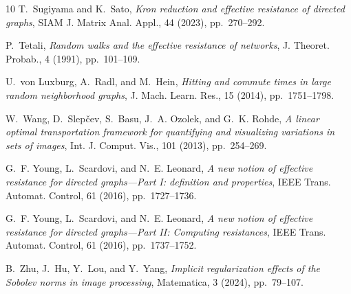 \documentclass[11pt,a4paper]{article}
\begin{document}
\begin{thebibliography}{10}
    {\sc T.~Sugiyama and K.~Sato}, {\em Kron reduction and effective resistance of directed graphs}, SIAM J. Matrix Anal. Appl., 44 (2023), pp.~270--292.

    {\sc P.~Tetali}, {\em Random walks and the effective resistance of networks}, J. Theoret. Probab., 4 (1991), pp.~101--109.

    {\sc U.~von Luxburg, A.~Radl, and M.~Hein}, {\em Hitting and commute times in large random neighborhood graphs}, J. Mach. Learn. Res., 15 (2014), pp.~1751--1798.

    {\sc W.~Wang, D.~Slep{\v c}ev, S.~Basu, J.~A. Ozolek, and G.~K. Rohde}, {\em A linear optimal transportation framework for quantifying and visualizing variations in sets of images}, Int. J. Comput. Vis., 101 (2013), pp.~254--269.

    {\sc G.~F. Young, L.~Scardovi, and N.~E. Leonard}, {\em A new notion of effective resistance for directed graphs---{P}art {I}: definition and properties}, IEEE Trans. Automat. Control, 61 (2016), pp.~1727--1736.

    {\sc G.~F. Young, L.~Scardovi, and N.~E. Leonard}, {\em A new notion of effective resistance for directed graphs---{P}art {II}: {C}omputing resistances}, IEEE Trans. Automat. Control, 61 (2016), pp.~1737--1752.

    {\sc B.~Zhu, J.~Hu, Y.~Lou, and Y.~Yang}, {\em Implicit regularization effects of the {S}obolev norms in image processing}, Matematica, 3 (2024), pp.~79--107.

\end{thebibliography}
\end{document}
